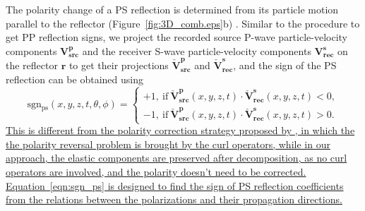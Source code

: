 \documentclass[manuscript,ulem,graphix,revised]{geophysics}
\begin{document}
The polarity change of a PS reflection is determined from its particle motion parallel to the reflector (Figure~\ref{fig:3D_comb.eps}b) \citep{aki80}. Similar to the procedure to get PP reflection signs, we project the recorded source P-wave particle-velocity components $\mathbf{V}^{\mathbf{p}}_{\mathbf{src}}$ and the receiver S-wave particle-velocity components $\mathbf{V}^{\mathbf{s}}_{\mathbf{rec}}$ on the reflector $\mathbf{r}$ to get their projections $\check{\mathbf{V}}^{\mathbf{p}}_{\mathbf{src}}$ and $\check{\mathbf{V}}^{\mathbf{s}}_{\mathbf{rec}}$, and the sign of the PS reflection can be obtained using
\begin{equation}
\mathrm{sgn_{ps}}(x,y,z,t,\theta,\phi)=\begin{cases}
 +1, \ \mathrm{if} \ \check{\mathbf{V}}^{\mathbf{p}}_{\mathbf{src}}(x,y,z,t) \cdot \check{\mathbf{V}}^{\mathbf{s}}_{\mathbf{rec}}(x,y,z,t)<0, \\ 
 -1, \ \mathrm{if} \ \check{\mathbf{V}}^{\mathbf{p}}_{\mathbf{src}}(x,y,z,t) \cdot \check{\mathbf{V}}^{\mathbf{s}}_{\mathbf{rec}}(x,y,z,t)>0 .
\end{cases}
\label{eqn:sgn_ps}
\end{equation}
\marginpar{[1,4,5,10]}\uline{This is different from the polarity correction strategy proposed by \mbox{\citet{du12, du14}}, in which the the polarity reversal problem is brought by the curl operators, while in our approach, the elastic components are preserved after decomposition, as no curl operators are involved, and the polarity doesn't need to be corrected. Equation~\ref{eqn:sgn_ps} is designed to find the sign of PS reflection coefficients from the relations between the polarizations and their propagation directions.}
\end{document}
